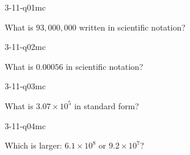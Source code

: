 

\begin{practiceQuestion}{3-11-q01}{mc}
\begin{questionText}
What is $93{,}000{,}000$ written in scientific notation?
\end{questionText}
\end{practiceQuestion}

\begin{practiceQuestion}{3-11-q02}{mc}
\begin{questionText}
What is $0.00056$ in scientific notation?
\end{questionText}
\end{practiceQuestion}

\begin{practiceQuestion}{3-11-q03}{mc}
\begin{questionText}
What is $3.07 \times 10^5$ in standard form?
\end{questionText}
\end{practiceQuestion}

\begin{practiceQuestion}{3-11-q04}{mc}
\begin{questionText}
Which is larger: $6.1 \times 10^8$ or $9.2 \times 10^7$?
\end{questionText}
\end{practiceQuestion}


